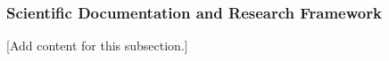 
\subsubsection{Scientific Documentation and Research Framework}
\label{subsubsec:design_9_1_scientific_documentation_framework}

[Add content for this subsection.]
